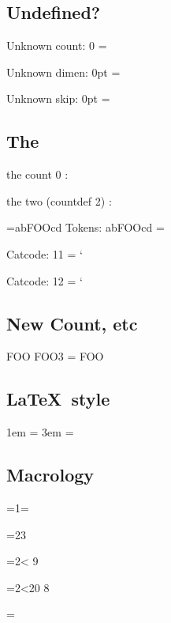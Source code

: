 \documentclass{article}
\begin{document}
\subsection{Undefined?}

Unknown count: 0 = \the{}\relax

Unknown dimen: 0pt = \the{}\relax

Unknown skip: 0pt = \the{}\relax

\subsection{The}
the count 0 : \the{}

the two (countdef 2) : \the\two


\def\foo{FOO}


={ab\foo cd}
Tokens: abFOOcd = \the{}

Catcode: 11 = \the\catcode`\A

Catcode: 12 = \the\catcode`\@


\subsection{New Count, etc}
\newcount\foo
\foo3 = \the\foo

\subsection{\LaTeX\ style}
\newlength{\foolen}
\setlength{\foolen}{1em}
1em = \the\foolen
\addtolength{\foolen}{2em}
3em = \the\foolen

\subsection{Macrology}
\def\numthree{3}
=1=\the{}

=2\numthree\relax
[23=\the\count2]

=2< 9\fi
[29=\the\count2]

=2\ifnum{}<20 8\fi
[29=\the\count2]

\makeatletter
\count\tw@=\@M\relax
[10000=\the\count\tw@]
[\chardef\mydollar=36\relax
\$a\$ = \mydollar a\mydollar]

\makeatother
\end{document}
